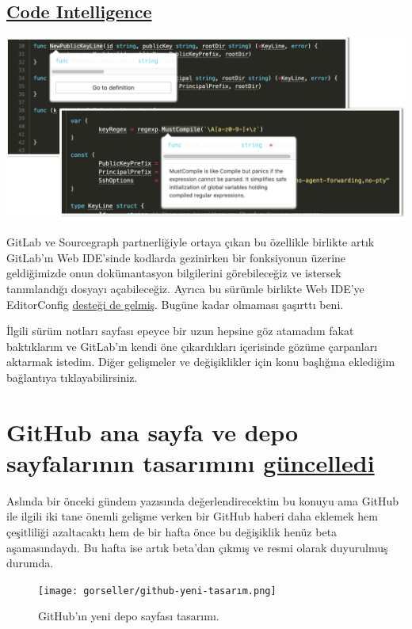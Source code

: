 \documentclass[11pt]{article}
\begin{document}
\subsection{\href{https://about.gitlab.com/releases/2020/06/22/gitlab-13-1-released/\#code-intelligence}{Code Intelligence}}
\label{sec:org9f68aa6}
\begin{center}
\includegraphics[width=.9\linewidth]{gorseller/gitlab-code-intelligence.png}
\end{center}

GitLab ve Sourcegraph partnerliğiyle ortaya çıkan bu özellikle birlikte artık
GitLab'ın Web IDE'sinde kodlarda gezinirken bir fonksiyonun üzerine
geldiğimizde onun dokümantasyon bilgilerini görebileceğiz ve istersek
tanımlandığı dosyayı açabileceğiz. Ayrıca bu sürümle birlikte Web IDE'ye
EditorConfig \href{https://about.gitlab.com/releases/2020/06/22/gitlab-13-1-released/\#code-intelligence}{desteği de gelmiş}. Bugüne kadar olmaması şaşırttı beni.

İlgili sürüm notları sayfası epeyce bir uzun hepsine göz atamadım fakat
baktıklarım ve GitLab'ın kendi öne çıkardıkları içerisinde gözüme çarpanları
aktarmak istedim. Diğer gelişmeler ve değişiklikler için konu başlığına
eklediğim bağlantıya tıklayabilirsiniz.
\section{GitHub ana sayfa ve depo sayfalarının tasarımını \href{https://github.blog/changelog/2020-06-23-design-updates-to-repositories-and-github-ui/}{güncelledi}}
\label{sec:org0eda56c}
Aslında bir önceki gündem yazısında değerlendirecektim bu konuyu ama GitHub
ile ilgili iki tane önemli gelişme verken bir GitHub haberi daha eklemek hem
çeşitliliği azaltacaktı hem de bir hafta önce bu değişiklik henüz beta
aşamasındaydı. Bu hafta ise artık beta'dan çıkmış ve resmi olarak duyurulmuş
durumda.

\begin{figure}[htbp]
\centering
\texttt{[image: gorseller/github-yeni-tasarım.png]}
\caption{GitHub'ın yeni depo sayfası tasarımı.}
\end{figure}
\end{document}
